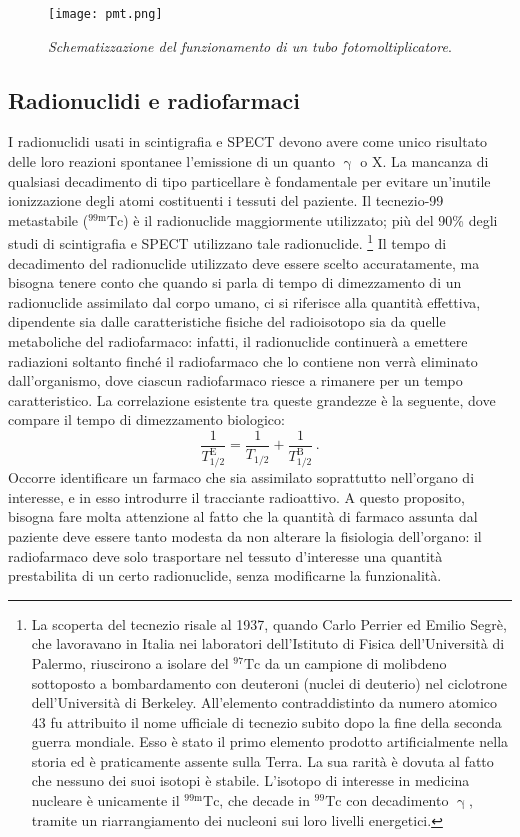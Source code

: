 \documentclass{report}
\numberwithin{equation}{section}
\numberwithin{figure}{section}
\begin{document}
\begin{figure}[htp]
    \centering
    \texttt{[image: pmt.png]}
    \caption{\label{fig:pmt} \textit{Schematizzazione del funzionamento di un tubo fotomoltiplicatore}.}
\end{figure}

\subsection{Radionuclidi e radiofarmaci}
I radionuclidi usati in scintigrafia e SPECT devono avere come unico risultato delle loro reazioni spontanee l'emissione di un quanto $\upgamma$ o X. La mancanza di qualsiasi decadimento di tipo particellare è fondamentale per evitare un'inutile ionizzazione degli atomi costituenti i tessuti del paziente. Il tecnezio-99 metastabile ($\mathrm{^{99m}Tc}$) è il radionuclide maggiormente utilizzato; più del 90\% degli studi di scintigrafia e SPECT utilizzano tale radionuclide.%
\footnote{La scoperta del tecnezio risale al 1937, quando Carlo Perrier ed Emilio Segrè, che lavoravano in Italia nei laboratori dell'Istituto di Fisica dell'Università di Palermo, riuscirono a isolare del $\mathrm{^{97}Tc}$ da un campione di molibdeno sottoposto a bombardamento con deuteroni (nuclei di deuterio) nel ciclotrone dell'Università di Berkeley. All'elemento contraddistinto da numero atomico 43 fu attribuito il nome ufficiale di tecnezio subito dopo la fine della seconda guerra mondiale. Esso è stato il primo elemento prodotto artificialmente nella storia ed è praticamente assente sulla Terra. La sua rarità è dovuta al fatto che nessuno dei suoi isotopi è stabile. L'isotopo di interesse in medicina nucleare è unicamente il $\mathrm{^{99m}Tc}$, che decade in $\mathrm{^{99}Tc}$ con decadimento $\upgamma$, tramite un riarrangiamento dei nucleoni sui loro livelli energetici.}
Il tempo di decadimento del radionuclide utilizzato deve essere scelto accuratamente, ma bisogna tenere conto che quando si parla di tempo di dimezzamento di un radionuclide assimilato dal corpo umano, ci si riferisce alla quantità effettiva, dipendente sia dalle caratteristiche fisiche del radioisotopo sia da quelle metaboliche del radiofarmaco: infatti, il radionuclide continuerà a emettere radiazioni soltanto finché il radiofarmaco che lo contiene non verrà eliminato dall'organismo, dove ciascun radiofarmaco riesce a rimanere per un tempo caratteristico. La correlazione esistente tra queste grandezze è la seguente, dove compare il tempo di dimezzamento biologico:
\begin{equation}
    \frac{1}{T_{1/2}^\mathrm{E}} = \frac{1}{T_{1/2}} + \frac{1}{T_{1/2}^\mathrm{B}}\,.
\end{equation}
Occorre identificare un farmaco che sia assimilato soprattutto nell'organo di interesse, e in esso introdurre il tracciante radioattivo. A questo proposito, bisogna fare molta attenzione al fatto che la quantità di farmaco assunta dal paziente deve essere tanto modesta da non alterare la fisiologia dell'organo: il radiofarmaco deve solo trasportare nel tessuto d'interesse una quantità prestabilita di un certo radionuclide, senza modificarne la funzionalità.
\end{document}
